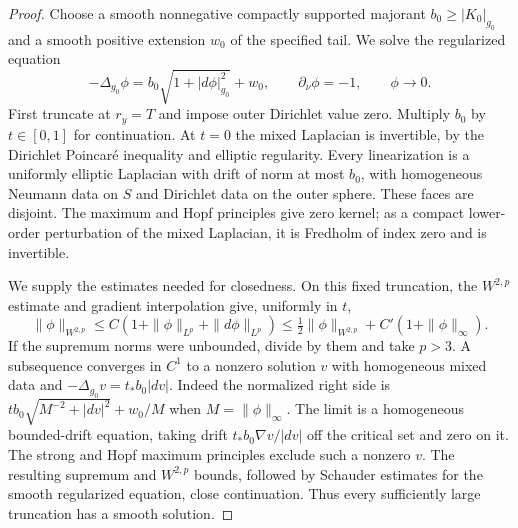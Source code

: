 \begin{proof}
Choose a smooth nonnegative compactly supported majorant
$b_0\ge|K_0|_{g_0}$ and a smooth positive extension $w_0$ of the
specified tail. We solve the regularized equation
\begin{equation}
 \label{ch:rest:semilinear}
 -\Delta_{g_0}\phi=b_0\sqrt{1+|d\phi|_{g_0}^2}+w_0,
 \qquad\partial_\nu\phi=-1,\qquad\phi\longrightarrow0.
\end{equation}
First truncate at $r_y=T$ and impose outer Dirichlet value zero.
Multiply $b_0$ by $t\in[0,1]$ for continuation. At $t=0$ the mixed
Laplacian is invertible, by the Dirichlet Poincar\'e inequality and
elliptic regularity. Every linearization is a uniformly elliptic
Laplacian with drift of norm at most $b_0$, with homogeneous Neumann
data on $S$ and Dirichlet data on the outer sphere. These faces are
disjoint. The maximum and Hopf principles give zero kernel; as a
compact lower-order perturbation of the mixed Laplacian, it is
Fredholm of index zero and is invertible.

We supply the estimates needed for closedness. On this fixed truncation,
the $W^{2,p}$ estimate and gradient interpolation give, uniformly in $t$,
\[
 \|\phi\|_{W^{2,p}}
 \le C(1+\|\phi\|_{L^p}+\|d\phi\|_{L^p})
 \le\tfrac12\|\phi\|_{W^{2,p}}+C'(1+\|\phi\|_\infty).
\]
If the supremum norms were unbounded, divide by them and take $p>3$.
A subsequence converges in $C^1$ to a nonzero solution $v$ with
homogeneous mixed data and
$-\Delta_{g_0}v=t_*b_0|dv|$. Indeed the normalized right side is
$t b_0\sqrt{M^{-2}+|dv|^2}+w_0/M$ when $M=\|\phi\|_\infty$.
The limit is a homogeneous bounded-drift equation, taking drift
$t_*b_0\nabla v/|dv|$ off the critical set and zero on it. The strong
and Hopf maximum principles exclude such a nonzero $v$.
The resulting supremum and $W^{2,p}$ bounds, followed by Schauder
estimates for the smooth regularized equation, close continuation.
Thus every sufficiently large truncation has a smooth solution.


\end{proof}
